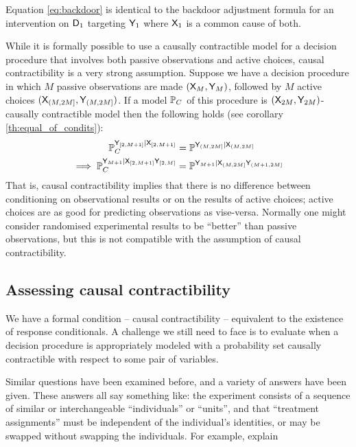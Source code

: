 Equation \ref{eq:backdoor} is identical to the backdoor adjustment formula for an intervention on $\mathsf{D}_1$ targeting $\mathsf{Y}_1$ where $\mathsf{X}_1$ is a common cause of both.

While it is formally possible to use a causally contractible model for a decision procedure that involves both passive observations and active choices, causal contractibility is a very strong assumption. Suppose we have a decision procedure in which $M$ passive observations are made $(\mathsf{X}_M,\mathsf{Y}_M)$, followed by $M$ active choices $(\mathsf{X}_{(M,2M]},\mathsf{Y}_{(M,2M]})$. If a model $\mathbb{P}_C$ of this procedure is $(\mathsf{X}_{2M},\mathsf{Y}_{2M})$-causally contractible model then the following holds (see corollary \ref{th:equal_of_condits}):
\begin{align}
    \mathbb{P}^{\mathsf{Y}_{[2,M+1]}|\mathsf{X}_{[2,M+1]}}_C &= \mathbb{P}^{\mathsf{Y}_{(M,2M]}|\mathsf{X}_{(M,2M]}}\\
    \implies \mathbb{P}^{\mathsf{Y}_{M+1}|\mathsf{X}_{[2,M+1]}\mathsf{Y}_{[2,M]}}_C &= \mathbb{P}^{\mathsf{Y}_{M+1}|\mathsf{X}_{(M,2M]}\mathsf{Y}_{(M+1,2M]}}
\end{align}
That is, causal contractibility implies that there is no difference between conditioning on observational results or on the results of active choices; active choices are as good for predicting observations as vise-versa. Normally one might consider randomised experimental results to be ``better'' than passive observations, but this is not compatible with the assumption of causal contractibility.

\subsection{Assessing causal contractibility}\label{ssec:assessing}

We have a formal condition -- causal contractibility -- equivalent to the existence of response conditionals. A challenge we still need to face is to evaluate when a decision procedure is appropriately modeled with a probability set causally contractible with respect to some pair of variables.

Similar questions have been examined before, and a variety of answers have been given. These answers all say something like: the experiment consists of a sequence of similar or interchangeable ``individuals'' or ``units'', and that ``treatment assignments'' must be independent of the individual's identities, or may be swapped without swapping the individuals. For example, \citet{greenland_identifiability_1986} explain

